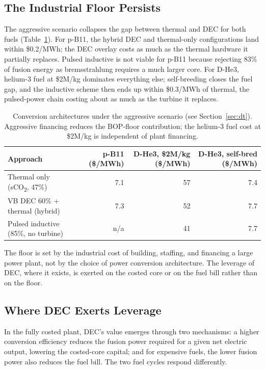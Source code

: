 \documentclass{article}
\begin{document}
\subsection{The Industrial Floor Persists}
\label{sec:converge}

The aggressive scenario collapses the gap between thermal and DEC
for both fuels (Table~\ref{tab:agg}). For p-B11, the hybrid DEC and thermal-only
configurations land within \$0.2/MWh; the DEC overlay costs
as much as the thermal hardware it partially replaces. Pulsed inductive is not viable for p-B11 because
rejecting 83\% of fusion energy as bremsstrahlung requires a much
larger core. For D-He3, helium-3 fuel at \$2M/kg dominates
everything else; self-breeding closes the fuel gap, and the
inductive scheme then ends up within \$0.3/MWh of thermal, the pulsed-power
chain costing about as much as the turbine it replaces.

\begin{table}[htbp]
\caption{Conversion architectures under the aggressive scenario
(see Section~\ref{sec:dt}). Aggressive financing reduces the
BOP-floor contribution; the helium-3 fuel cost at \$2M/kg is
independent of plant financing.}
\label{tab:agg}
\centering
\begin{tabular}{lrrr}
\toprule
Approach & p-B11 (\$/MWh) & D-He3, \$2M/kg (\$/MWh) & D-He3, self-bred (\$/MWh) \\
\midrule
Thermal only (sCO\textsubscript{2}, 47\%) & 7.1 & 57 & 7.4 \\
VB DEC 60\% + thermal (hybrid) & 7.3 & 52 & 7.7 \\
Pulsed inductive (85\%, no turbine) & n/a & 41 & 7.7 \\
\bottomrule
\end{tabular}
\end{table}

The floor is set by the industrial cost of building, staffing, and
financing a large power plant, not by the choice of power
conversion architecture. The leverage of DEC, where it exists, is
exerted on the costed core or on the fuel bill rather than on the
floor.

\subsection{Where DEC Exerts Leverage}
\label{sec:where}

In the fully costed plant, DEC's value emerges through two
mechanisms: a higher conversion efficiency reduces the fusion power
required for a given net electric output, lowering the costed-core
capital; and for expensive fuels, the lower fusion power also
reduces the fuel bill. The two fuel cycles respond differently.
\end{document}
